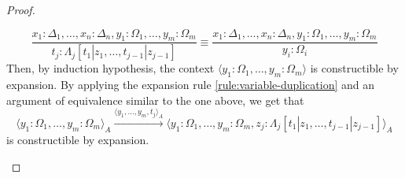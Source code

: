 \begin{proof}
\begin{itemize}
\begin{equation*}
                \dfrac{
                    x_1 : \Delta_1, \dots, x_n : \Delta_n,
                    y_1 : \Omega_1, \dots, y_{m} : \Omega_{m}
                }{
                    t_j : \Lambda_j[t_1 | z_1, \dots, t_{j-1} | z_{j-1}] 
                }
                \equiv
                \dfrac{
                    x_1 : \Delta_1, \dots, x_n : \Delta_n,
                    y_1 : \Omega_1, \dots, y_{m} : \Omega_{m}
                }{
                    y_i : \Omega_i 
                }
            \end{equation*}
            Then, by induction hypothesis, the context
            $\langle y_1 : \Omega_1, \dots, y_m : \Omega_m \rangle$
            is constructible by expansion. By applying the expansion
            rule \ref{rule:variable-duplication} and an argument of 
            equivalence similar to the one above, we get that 
             \begin{equation*} %
                \langle y_1 : \Omega_1, \dots, y_m : \Omega_m \rangle_A 
                \xrightarrow{ \langle y_1, \dots, y_m, t_j \rangle_A }
                \langle y_1 : \Omega_1, \dots, y_m : \Omega_m, z_j : \Lambda_j[t_1 | z_1, \dots, t_{j-1} | z_{j-1}] \rangle_A
            \end{equation*}
            is constructible by expansion.


\end{itemize}
\end{proof}
